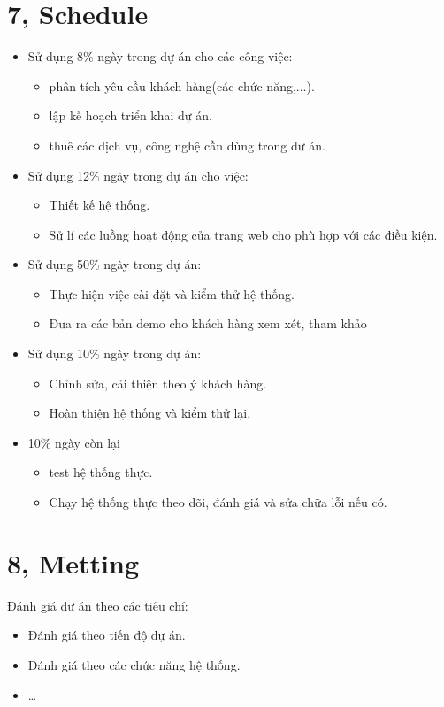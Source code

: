 \documentclass[a4paper,11pt]{report}
\begin{document}
\section*{7, Schedule}
\begin{itemize}
\item Sử dụng 8\% ngày trong dự án cho các công việc:
\begin{itemize}
\item phân tích yêu cầu khách hàng(các chức năng,...).
\item lập kế hoạch triển khai dự án.
\item thuê các dịch vụ, công nghệ cần dùng trong dư án.
\end{itemize}
\item Sử dụng 12\% ngày trong dự án cho việc:
\begin{itemize}
\item Thiết kế hệ thống.
\item Sử lí các luồng hoạt động của trang web cho phù hợp với các điều kiện.
\end{itemize}
\item Sử dụng 50\% ngày trong dự án:
\begin{itemize}
\item Thực hiện việc cài đặt và kiểm thử hệ thống.
\item Đưa ra các bản demo cho khách hàng xem xét, tham khảo
\end{itemize} 
\item Sử dụng 10\% ngày trong dự án:
\begin{itemize}
\item Chỉnh sửa, cải thiện theo ý khách hàng.
\item Hoàn thiện hệ thống và kiểm thử lại.
\end{itemize}
\item 10\% ngày còn lại
\begin{itemize}
\item test hệ thống thực.
\item Chạy hệ thống thực theo dõi, đánh giá và sửa chữa lỗi nếu có.
\end{itemize}
\end{itemize}
\section*{8, Metting}
Đánh giá dư án theo các tiêu chí:
\begin{itemize}
\item Đánh giá theo tiến độ dự án.
\item Đánh giá theo các chức năng hệ thống.
\item \ldots
\end{itemize}
\end{document}
